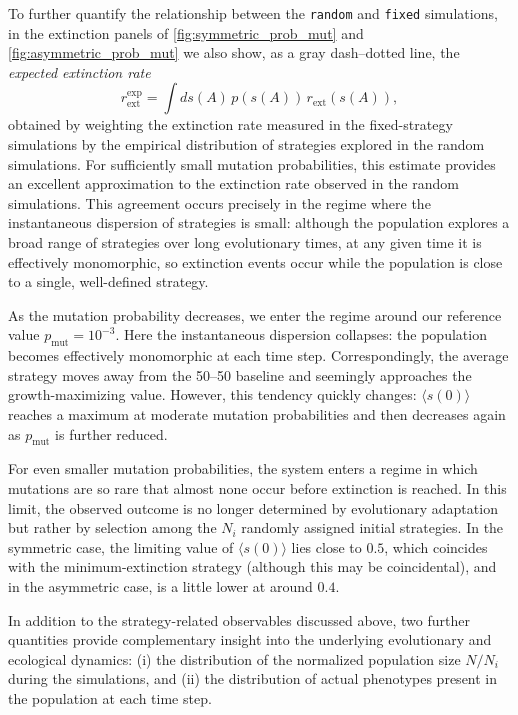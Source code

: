 \documentclass[a4paper,10pt,twocolumn]{article}
\begin{document}
To further quantify the relationship between the \texttt{random} and \texttt{fixed} simulations, in the extinction panels of \autoref{fig:symmetric_prob_mut} and \autoref{fig:asymmetric_prob_mut} we also show, as a gray dash--dotted line, the \emph{expected extinction rate}
\begin{equation}
    r_{\text{ext}}^{\text{exp}}=\int ds(A)\, p(s(A))\, r_{\text{ext}}(s(A)),
\end{equation}
obtained by weighting the extinction rate measured in the fixed-strategy simulations by the empirical distribution of strategies explored in the random simulations.
For sufficiently small mutation probabilities, this estimate provides an excellent approximation to the extinction rate observed in the random simulations.
This agreement occurs precisely in the regime where the instantaneous dispersion of strategies is small: although the population explores a broad range of strategies over long evolutionary times, at any given time it is effectively monomorphic, so extinction events occur while the population is close to a single, well-defined strategy.

As the mutation probability decreases, we enter the regime around our reference value $p_{\text{mut}}=10^{-3}$. Here the instantaneous dispersion collapses: the population becomes effectively monomorphic at each time step. Correspondingly, the average strategy moves away from the 50--50 baseline and seemingly approaches the growth-maximizing value. However, this tendency quickly changes:  $\langle s(0)\rangle$ reaches a maximum at moderate mutation probabilities and then decreases again as $p_{\text{mut}}$ is further reduced.

For even smaller mutation probabilities, the system enters a regime in which mutations are so rare that almost none occur before extinction is reached. In this limit, the observed outcome is no longer determined by evolutionary adaptation but rather by selection among the $N_i$ randomly assigned initial strategies. In the symmetric case, the limiting value of $\langle s(0)\rangle$ lies close to $0.5$, which coincides with the minimum-extinction strategy (although this may be coincidental), and in the asymmetric case, is a little lower at around $0.4$.

In addition to the strategy-related observables discussed above, two further quantities provide complementary insight into the underlying evolutionary and ecological dynamics: (i) the distribution of the normalized population size $N/N_i$ during the simulations, and (ii) the distribution of actual phenotypes present in the population at each time step.
\end{document}
